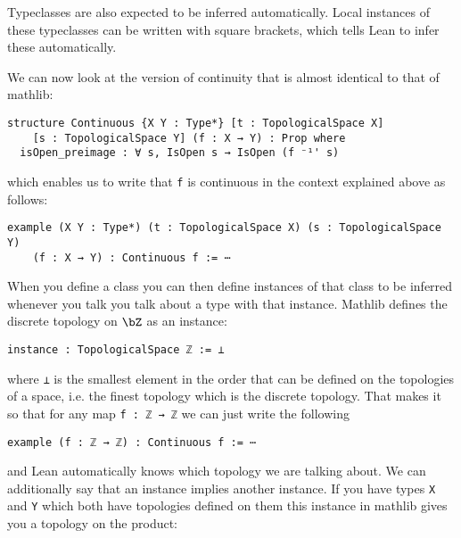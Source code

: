 Typeclasses are also expected to be inferred automatically. 
Local instances of these typeclasses can be written with square brackets, which tells Lean to infer these automatically.

We can now look at the version of continuity that is almost identical to that of mathlib: 
\href{https://github.com/leanprover-community/mathlib4/blob/93828f4cd10fb8cab31700b110fd2751d36bf1b8/Mathlib/Topology/Defs/Basic.lean#L138-L144}{\faExternalLink}

\begin{lstlisting}
structure Continuous {X Y : Type*} [t : TopologicalSpace X]
    [s : TopologicalSpace Y] (f : X → Y) : Prop where
  isOpen_preimage : ∀ s, IsOpen s → IsOpen (f ⁻¹' s)
\end{lstlisting}

which enables us to write that \lstinline{f} is continuous in the context explained above as follows:

\begin{lstlisting}
example (X Y : Type*) (t : TopologicalSpace X) (s : TopologicalSpace Y) 
    (f : X → Y) : Continuous f := ⋯
\end{lstlisting}

When you define a class you can then define instances of that class to be inferred whenever you talk you talk about a type with that instance. 
Mathlib defines the discrete topology on $\bZ$ as an instance: 
\href{https://github.com/leanprover-community/mathlib4/blob/93828f4cd10fb8cab31700b110fd2751d36bf1b8/Mathlib/Topology/Order.lean#L481-L481}{\faExternalLink}

\begin{lstlisting}
instance : TopologicalSpace ℤ := ⊥
\end{lstlisting}

where \lstinline{⊥} is the smallest element in the order that can be defined on the topologies of a space, i.e. the finest topology which is the discrete topology. 
That makes it so that for any map \lstinline{f : ℤ → ℤ} we can just write the following

\begin{lstlisting}
example (f : ℤ → ℤ) : Continuous f := ⋯
\end{lstlisting} 

and Lean automatically knows which topology we are talking about. 
We can additionally say that an instance implies another instance. 
If you have types \lstinline{X} and \lstinline{Y} which both have topologies defined on them this instance in mathlib gives you a topology on the product: 
\href{https://github.com/leanprover-community/mathlib4/blob/93828f4cd10fb8cab31700b110fd2751d36bf1b8/Mathlib/Topology/Constructions.lean#L50-L52}{\faExternalLink}

